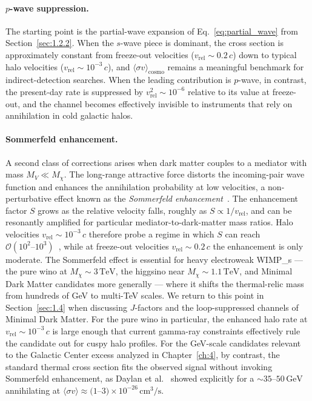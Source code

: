 \paragraph{$p$-wave suppression.}
The starting point is the partial-wave expansion of Eq.~\eqref{eq:partial_wave} from Section~\ref{sec:1.2.2}.
When the $s$-wave piece is dominant, the cross section is approximately constant from freeze-out velocities ($v_\mathrm{rel}\sim 0.2\,c$) down to typical halo velocities ($v_\mathrm{rel}\sim 10^{-3}\,c$), and $\langle\sigma v\rangle_\mathrm{cosmo}$ remains a meaningful benchmark for indirect-detection searches.
When the leading contribution is $p$-wave, in contrast, the present-day rate is suppressed by $v_\mathrm{rel}^2 \sim 10^{-6}$ relative to its value at freeze-out, and the channel becomes effectively invisible to instruments that rely on annihilation in cold galactic halos.

\paragraph{Sommerfeld enhancement.}
A second class of corrections arises when dark matter couples to a mediator with mass $M_V \ll M_\chi$.
The long-range attractive force distorts the incoming-pair wave function and enhances the annihilation probability at low velocities, a non-perturbative effect known as the \emph{Sommerfeld enhancement}~\cite{Hisano:2004ds,ArkaniHamed:2008qn}.
The enhancement factor $S$ grows as the relative velocity falls, roughly as $S\propto 1/v_\mathrm{rel}$, and can be resonantly amplified for particular mediator-to-dark-matter mass ratios.
Halo velocities $v_\mathrm{rel}\sim 10^{-3}\,c$ therefore probe a regime in which $S$ can reach $\mathcal{O}(10^2\text{--}10^3)$~\cite{Hisano:2004ds}, while at freeze-out velocities $v_\mathrm{rel}\sim 0.2\,c$ the enhancement is only moderate.
The Sommerfeld effect is essential for heavy electroweak \glspl{WIMP_} --- the pure wino at $M_\chi\sim 3\,\mathrm{TeV}$, the higgsino near $M_\chi\sim 1.1\,\mathrm{TeV}$, and Minimal Dark Matter candidates more generally --- where it shifts the thermal-relic mass from hundreds of GeV to multi-TeV scales. We return to this point in Section~\ref{sec:1.4} when discussing $J$-factors and the loop-suppressed channels of Minimal Dark Matter.
For the pure wino in particular, the enhanced halo rate at $v_\mathrm{rel}\sim 10^{-3}\,c$ is large enough that current gamma-ray constraints effectively rule the candidate out for cuspy halo profiles.
For the GeV-scale candidates relevant to the Galactic Center excess analyzed in Chapter~\ref{ch:4}, by contrast, the standard thermal cross section fits the observed signal without invoking Sommerfeld enhancement, as Daylan et al.~\cite{Daylan:2014rsa} showed explicitly for a $\sim 35$--$50\,\mathrm{GeV}$ \WIMP annihilating at $\langle\sigma v\rangle \approx (1$--$3)\times 10^{-26}\,\mathrm{cm}^3/\mathrm{s}$.

